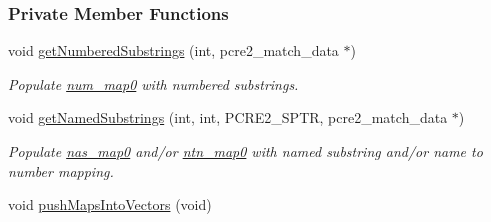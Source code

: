 \subsubsection*{Private Member Functions}
\begin{DoxyCompactItemize}
\item 
void \hyperlink{classjpcre2_1_1RegexMatch_a82bfef9700b1c62b84e4a32ee4b0731e}{get\+Numbered\+Substrings} (int, pcre2\+\_\+match\+\_\+data $\ast$)
\begin{DoxyCompactList}\small\item\em Populate \hyperlink{classjpcre2_1_1RegexMatch_a94ad930ea8cb22873737fda344bae508}{num\+\_\+map0} with numbered substrings. \end{DoxyCompactList}\item 
void \hyperlink{classjpcre2_1_1RegexMatch_ac494245673c474d518e8ae47b2ab9db9}{get\+Named\+Substrings} (int, int, P\+C\+R\+E2\+\_\+\+S\+P\+TR, pcre2\+\_\+match\+\_\+data $\ast$)
\begin{DoxyCompactList}\small\item\em Populate \hyperlink{classjpcre2_1_1RegexMatch_a36749947847f266de03c3991ac88a694}{nas\+\_\+map0} and/or \hyperlink{classjpcre2_1_1RegexMatch_a1c790683d023313967ce80db6045419f}{ntn\+\_\+map0} with named substring and/or name to number mapping. \end{DoxyCompactList}\item 
void \hyperlink{classjpcre2_1_1RegexMatch_aeeffc8edc43a8e5d1d24ae4055213730}{push\+Maps\+Into\+Vectors} (void)\hypertarget{classjpcre2_1_1RegexMatch_aeeffc8edc43a8e5d1d24ae4055213730}{}\label{classjpcre2_1_1RegexMatch_aeeffc8edc43a8e5d1d24ae4055213730}


\end{DoxyCompactItemize}
